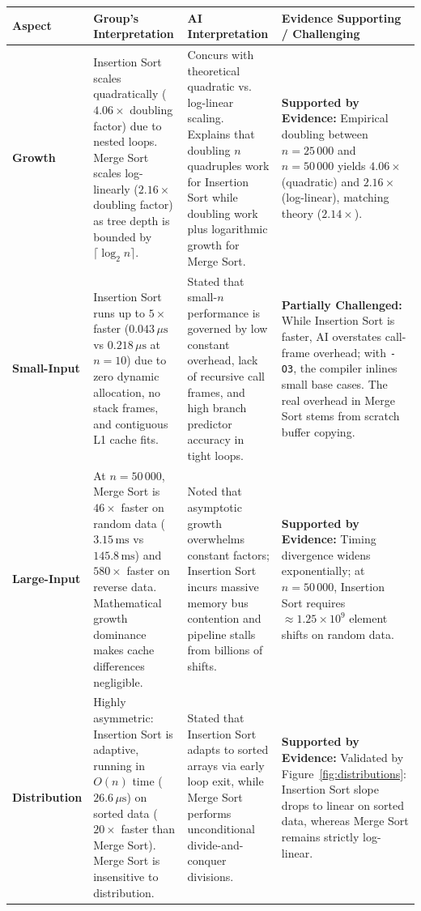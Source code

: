 \documentclass[11pt]{article}
\begin{document}
\begin{center}
\scriptsize
\renewcommand{\arraystretch}{1.18}
\label{tab:ai_eval}
\vspace{-0.4em}
\begin{tabularx}{\textwidth}{l >{\raggedright\arraybackslash}X >{\raggedright\arraybackslash}X >{\raggedright\arraybackslash}X}
\toprule
\textbf{Aspect} & \textbf{Group's Interpretation} & \textbf{AI Interpretation} & \textbf{Evidence Supporting / Challenging} \\
\midrule
\textbf{Growth} & Insertion Sort scales quadratically ($4.06\times$ doubling factor) due to nested loops. Merge Sort scales log-linearly ($2.16\times$ doubling factor) as tree depth is bounded by $\lceil \log_2 n \rceil$. & Concurs with theoretical quadratic vs. log-linear scaling. Explains that doubling $n$ quadruples work for Insertion Sort while doubling work plus logarithmic growth for Merge Sort. & \textbf{Supported by Evidence:} Empirical doubling between $n=25\,000$ and $n=50\,000$ yields $4.06\times$ (quadratic) and $2.16\times$ (log-linear), matching theory ($2.14\times$). \\
\midrule
\textbf{Small-Input} & Insertion Sort runs up to $5\times$ faster ($0.043\,\mu\text{s}$ vs $0.218\,\mu\text{s}$ at $n=10$) due to zero dynamic allocation, no stack frames, and contiguous L1 cache fits. & Stated that small-$n$ performance is governed by low constant overhead, lack of recursive call frames, and high branch predictor accuracy in tight loops. & \textbf{Partially Challenged:} While Insertion Sort is faster, AI overstates call-frame overhead; with \texttt{-O3}, the compiler inlines small base cases. The real overhead in Merge Sort stems from scratch buffer copying. \\
\midrule
\textbf{Large-Input} & At $n=50\,000$, Merge Sort is $46\times$ faster on random data ($3.15\,\text{ms}$ vs $145.8\,\text{ms}$) and $580\times$ faster on reverse data. Mathematical growth dominance makes cache differences negligible. & Noted that asymptotic growth overwhelms constant factors; Insertion Sort incurs massive memory bus contention and pipeline stalls from billions of shifts. & \textbf{Supported by Evidence:} Timing divergence widens exponentially; at $n=50\,000$, Insertion Sort requires $\approx 1.25 \times 10^9$ element shifts on random data. \\
\midrule
\textbf{Distribution} & Highly asymmetric: Insertion Sort is adaptive, running in $O(n)$ time ($26.6\,\mu\text{s}$) on sorted data ($20\times$ faster than Merge Sort). Merge Sort is insensitive to distribution. & Stated that Insertion Sort adapts to sorted arrays via early loop exit, while Merge Sort performs unconditional divide-and-conquer divisions. & \textbf{Supported by Evidence:} Validated by Figure~\ref{fig:distributions}: Insertion Sort slope drops to linear on sorted data, whereas Merge Sort remains strictly log-linear. \\

\end{tabularx}
\end{center}
\end{document}

